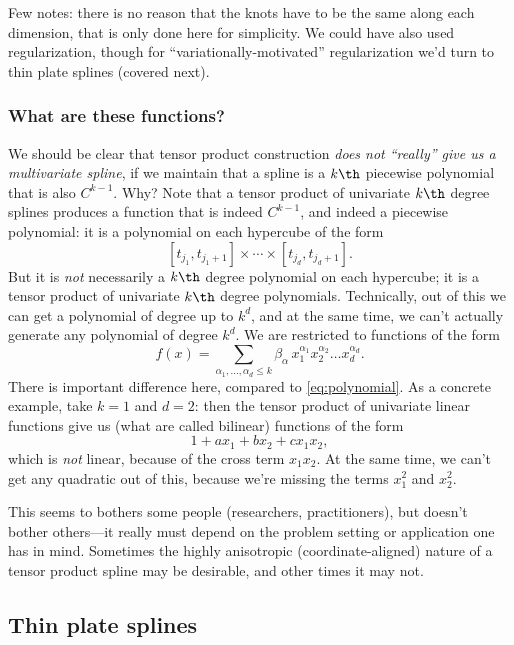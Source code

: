 \documentclass{article}
\begin{document}
Few notes: there is no reason that the knots have to be the same along each 
dimension, that is only done here for simplicity. We could have also used
regularization, though for ``variationally-motivated'' regularization we'd turn 
to thin plate splines (covered next).

\subsubsection{What are these functions?} 

We should be clear that tensor product construction \emph{does not ``really'' 
  give us a multivariate spline}, if we maintain that a spline is a $k\th$
piecewise polynomial that is also $C^{k-1}$. Why? Note that a tensor product of
univariate $k\th$ degree splines produces a function that is indeed $C^{k-1}$,
and indeed a piecewise polynomial: it is a polynomial on each hypercube of the
form        
\[
[t_{j_1}, t_{j_1+1}] \times \cdots \times [t_{j_d}, t_{j_d+1}]. 
\]
But it is \emph{not} necessarily a $k\th$ degree polynomial on each
hypercube; it is a tensor product of univariate $k\th$ degree
polynomials. Technically, out of this we can get a polynomial of degree up to 
$k^d$, and at the same time, we can't actually generate any polynomial of degree 
$k^d$. We are restricted to functions of the form   
\[
f(x) = \sum_{\alpha_1,\dots,\alpha_d \leq k} \beta_\alpha \, x_1^{\alpha_1}
x_2^{\alpha_2} \dots x_d^{\alpha_d}.
\]
There is important difference here, compared to \eqref{eq:polynomial}. As a
concrete example, take $k=1$ and $d=2$: then the tensor product of univariate
linear functions give us (what are called bilinear) functions of the form
\[
1 + a x_1 + b x_2 + c x_1 x_2,
\]
which is \emph{not} linear, because of the cross term $x_1 x_2$. At the same
time, we can't get any quadratic out of this, because we're missing the terms
$x_1^2$ and $x_2^2$. 

This seems to bothers some people (researchers, practitioners), but doesn't
bother others---it really must depend on the problem setting or application one
has in mind. Sometimes the highly anisotropic (coordinate-aligned) nature of a
tensor product spline may be desirable, and other times it may not.    

\subsection{Thin plate splines}
\end{document}

